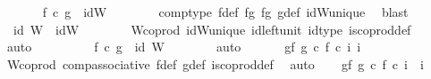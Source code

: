 \begin{isabellebody}
\ \ \ \ \isamarkupfalse%
\ {}{\isacharcolon}{\kern0pt}\ {\isachardoublequoteopen}f\ {\isasymcirc}\isactrlsub c\ g\ {\isacharequal}{\kern0pt}\ idW{\isachardoublequoteclose}\isanewline
\ \ \ \ \ \ \isamarkupfalse%
\ comp{\isacharunderscore}{\kern0pt}type\ f{\isacharunderscore}{\kern0pt}def\ fg{}\ fg{}\ g{\isacharunderscore}{\kern0pt}def\ idW{\isacharunderscore}{\kern0pt}unique\ \isamarkupfalse%
\ blast\isanewline
\ \ \ \ \isamarkupfalse%
\ {}{\isacharcolon}{\kern0pt}\ {\isachardoublequoteopen}id\ W\ {\isacharequal}{\kern0pt}\ idW{\isachardoublequoteclose}\isanewline
\ \ \ \ \ \ \isamarkupfalse%
\ W{\isacharunderscore}{\kern0pt}coprod\ idW{\isacharunderscore}{\kern0pt}unique\ id{\isacharunderscore}{\kern0pt}left{\isacharunderscore}{\kern0pt}unit{}\ id{\isacharunderscore}{\kern0pt}type\ is{\isacharunderscore}{\kern0pt}coprod{\isacharunderscore}{\kern0pt}def\ \isamarkupfalse%
\ auto\isanewline
\ \ \ \ \isamarkupfalse%
\ {}\ {}\ \isamarkupfalse%
\ {\isachardoublequoteopen}f\ {\isasymcirc}\isactrlsub c\ g\ {\isacharequal}{\kern0pt}\ id\ W{\isachardoublequoteclose}\isanewline
\ \ \ \ \ \ \isamarkupfalse%
\ auto\isanewline
\ \ \isamarkupfalse%
\isanewline
\isanewline
\ \ \isamarkupfalse%
\ gf{}{\isacharcolon}{\kern0pt}\ {\isachardoublequoteopen}{\isacharparenleft}{\kern0pt}g\ {\isasymcirc}\isactrlsub c\ f{\isacharparenright}{\kern0pt}\ {\isasymcirc}\isactrlsub c\ i{\isacharprime}{\kern0pt}\ i{\isacharprime}{\kern0pt}\isanewline
\ \ \ \ \isamarkupfalse%
\ W{\isacharprime}{\kern0pt}{\isacharunderscore}{\kern0pt}coprod\ comp{\isacharunderscore}{\kern0pt}associative{}\ f{\isacharunderscore}{\kern0pt}def\ g{\isacharunderscore}{\kern0pt}def\ is{\isacharunderscore}{\kern0pt}coprod{\isacharunderscore}{\kern0pt}def\ \isamarkupfalse%
\ auto\isanewline
\ \ \isamarkupfalse%
\ gf{}{\isacharcolon}{\kern0pt}\ {\isachardoublequoteopen}{\isacharparenleft}{\kern0pt}g\ {\isasymcirc}\isactrlsub c\ f{\isacharparenright}{\kern0pt}\ {\isasymcirc}\isactrlsub c\ i{\isacharprime}{\kern0pt}\ {\isacharequal}{\kern0pt}\ i{\isacharprime}{\kern0pt}\isanewline
\ \ \ \ \isamarkupfalse%

\end{isabellebody}
